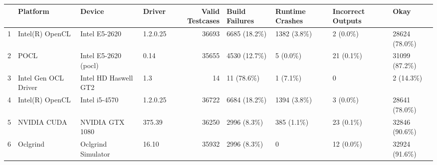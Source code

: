 \begin{tabular}{llllrllll}
\toprule
{} &              Platform &                Device &    Driver &  Valid Testcases & Build Failures & Runtime Crashes & Incorrect Outputs &           Okay \\
\midrule
1 &       Intel(R) OpenCL &         Intel E5-2620 &  1.2.0.25 &            36693 &   6685 (18.2\%) &     1382 (3.8\%) &          2 (0.0\%) &  28624 (78.0\%) \\
2 &                  POCL &  Intel E5-2620 (pocl) &      0.14 &            35655 &   4530 (12.7\%) &        5 (0.0\%) &         21 (0.1\%) &  31099 (87.2\%) \\
3 &  Intel Gen OCL Driver &  Intel HD Haswell GT2 &       1.3 &               14 &     11 (78.6\%) &        1 (7.1\%) &                 0 &      2 (14.3\%) \\
4 &       Intel(R) OpenCL &         Intel i5-4570 &  1.2.0.25 &            36722 &   6684 (18.2\%) &     1394 (3.8\%) &          3 (0.0\%) &  28641 (78.0\%) \\
5 &           NVIDIA CUDA &       NVIDIA GTX 1080 &    375.39 &            36250 &    2996 (8.3\%) &      385 (1.1\%) &         23 (0.1\%) &  32846 (90.6\%) \\
6 &              Oclgrind &    Oclgrind Simulator &     16.10 &            35932 &    2996 (8.3\%) &               0 &         12 (0.0\%) &  32924 (91.6\%) \\
\bottomrule
\end{tabular}
